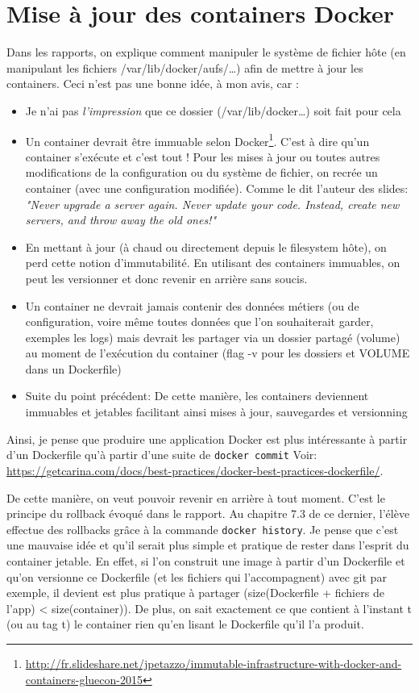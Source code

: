 \documentclass[11pt,a4paper,oneside]{report}
\newcommand{\code}[1]{\texttt{#1}}
\begin{document}
\section{Mise à jour des containers Docker}
Dans les rapports, on explique comment manipuler le système de fichier hôte (en manipulant les fichiers /var/lib/docker/aufs/\ldots{}) afin de mettre à jour les containers. Ceci n'est pas une bonne idée, à mon avis, car :

	\begin{itemize}
	\item Je n'ai pas \emph{l'impression} que ce dossier (/var/lib/docker\ldots{}) soit fait pour cela

	\item Un container devrait être immuable selon Docker\footnote{\url{http://fr.slideshare.net/jpetazzo/immutable-infrastructure-with-docker-and-containers-gluecon-2015}}. C'est à dire qu'un container s'exécute et c'est tout ! Pour les mises à jour ou toutes autres modifications de la configuration ou du système de fichier, on recrée un container (avec une configuration modifiée). Comme le dit l'auteur des slides: \textit{"Never upgrade a server again. Never update your code. Instead, create new servers, and throw away the old ones!"}

	\item En mettant à jour (à chaud ou directement depuis le filesystem hôte), on perd cette notion d'immutabilité. En utilisant des containers immuables, on peut les versionner et donc revenir en arrière sans soucis.

	\item Un container ne devrait jamais contenir des données métiers (ou de configuration, voire même toutes données que l'on  souhaiterait garder, exemples les logs) mais devrait les partager via un dossier partagé (volume) au moment de l'exécution du container (flag -v pour les dossiers et VOLUME dans un Dockerfile)

	\item Suite du point précédent: De cette manière, les containers deviennent immuables et jetables facilitant ainsi mises à jour, sauvegardes et versionning
	\end{itemize}

Ainsi, je pense que produire une application Docker est plus intéressante à partir d'un Dockerfile qu'à partir d'une suite de \code{docker commit} Voir: \url{https://getcarina.com/docs/best-practices/docker-best-practices-dockerfile/}.

De cette manière, on veut pouvoir revenir en arrière à tout moment. C'est le principe du rollback évoqué dans le rapport. Au chapitre 7.3 de ce dernier, l'élève effectue des rollbacks grâce à la commande \code{docker history}. Je pense que c'est une mauvaise idée et qu'il serait plus simple et pratique de rester dans l'esprit du container jetable. En effet, si l'on construit une image à partir d'un Dockerfile et qu'on versionne ce Dockerfile (et les fichiers qui l'accompagnent) avec git par exemple, il devient est plus pratique à partager (size(Dockerfile + fichiers de l'app) \textless{} size(container)). De plus, on sait exactement ce que contient à l'instant t (ou au tag t) le container rien qu'en lisant le Dockerfile qu'il l'a produit.
\end{document}
